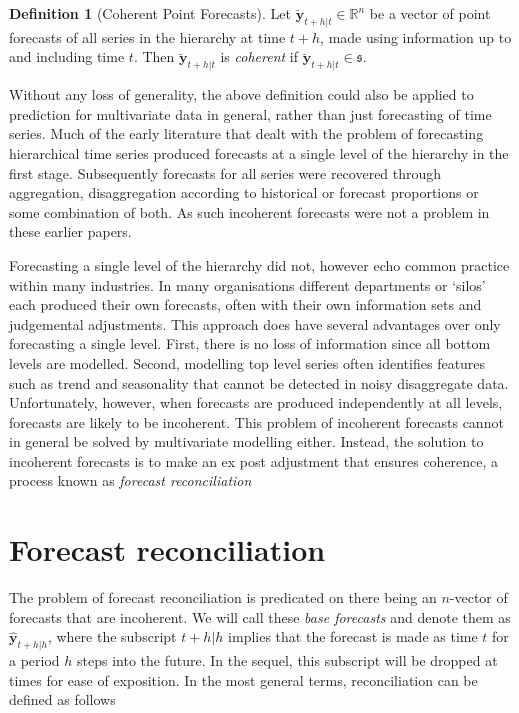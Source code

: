 \documentclass[12pt]{article}
\theoremstyle{definition}
\newtheorem{definition}{Definition}[section]
\theoremstyle{property}
\begin{document}
	\begin{definition}[Coherent Point Forecasts]\label{def:cohpoint}
		Let $\breve{\bm{y}}_{t+h|t} \in \mathbb{R}^n$ be a vector of point forecasts of all series in the hierarchy at time $t+h$, made using information up to and including time $t$. Then $\breve{\bm{y}}_{t+h|t}$ is \emph{coherent} if $\breve{\bm{y}}_{t+h|t} \in \mathfrak{s}$.
	\end{definition}

    Without any loss of generality, the above definition could also be applied to prediction for multivariate data in general, rather than just forecasting of time series.  Much of the early literature that dealt with the problem of forecasting hierarchical time series \citep[see][and references therein]{Gross1990} produced forecasts at a single level of the hierarchy in the first stage. Subsequently forecasts for all series were recovered through aggregation, disaggregation according to historical or forecast proportions or some combination of both.  As such incoherent forecasts were not a problem in these earlier papers.  
    
    Forecasting a single level of the hierarchy did not, however echo common practice within many industries.  In many organisations different departments or `silos' each produced their own forecasts, often with their own information sets and judgemental adjustments.  This approach does have several advantages over only forecasting a single level.  First, there is no loss of information since all bottom levels are modelled.  Second, modelling top level series often identifies features such as trend and seasonality that cannot be detected in noisy disaggregate data.  Unfortunately, however, when forecasts are produced independently at all levels, forecasts are likely to be incoherent.  This problem of incoherent forecasts cannot in general be solved by multivariate modelling either.  Instead, the solution to incoherent forecasts is to make an ex post adjustment that ensures coherence, a process known as {\em forecast reconciliation}
	
	
	
\section{Forecast reconciliation}\label{sec:Reconciliation}
	
	The problem of forecast reconciliation is predicated on there being an $n$-vector of forecasts that are incoherent.  We will call these {\em base forecasts} and denote them as $\hat{\bm{y}}_{t+h|h}$, where the subscript $t+h|h$ implies that the forecast is made as time $t$ for a period $h$ steps into the future.  In the sequel, this subscript will be dropped at times for ease of exposition.  In the most general terms, reconciliation can be defined as follows
	
\end{document}
